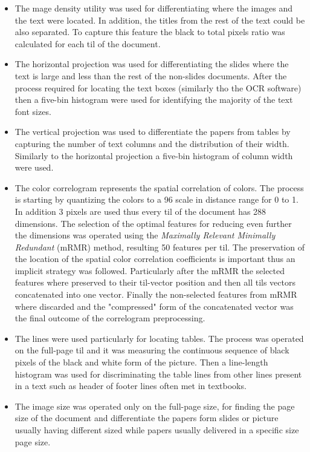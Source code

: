 \begin{itemize}
\item The mage density utility was used for differentiating where the images and the text were located. In addition, the titles from the rest of the text could be also separated. To capture this feature the black to total pixels ratio was calculated for each til of the document. 
\item The horizontal projection was used for differentiating the slides where the text is large and less than the rest of the non-slides documents. After the process required for locating the text boxes (similarly tho the OCR software) then a five-bin histogram were used for identifying the majority of the text font sizes.
\item The vertical projection was used to differentiate the papers from tables by capturing the number of text columns and the distribution of their width. Similarly to the horizontal projection a five-bin histogram of column width were used.
\item The color correlogram represents the spatial correlation of colors. The process is starting by quantizing the colors to a 96 scale in distance range for 0 to 1. In addition 3 pixels are used thus every til of the document has 288 dimensions. The selection of the optimal features for reducing even further the dimensions was operated using the \textit{Maximally Relevant Minimally Redundant} (mRMR) method, resulting 50 features per til. The preservation of the location of the spatial color correlation coefficients is important thus an implicit strategy was followed. Particularly after the mRMR the selected features where preserved to their til-vector position and then all tils vectors concatenated into one vector. Finally the non-selected features from mRMR where discarded and the "compressed" form of the concatenated vector was the final outcome of the correlogram preprocessing.
\item The lines were used particularly for locating tables. The process was operated on the full-page til and it was measuring the continuous sequence of black pixels of the black and white form of the picture. Then a line-length histogram was used for discriminating the table lines from other lines present in a text such as header of footer lines often met in textbooks.
\item The image size was operated only on the full-page size, for finding the page size of the document and differentiate the papers form slides or picture usually having different sized while papers usually delivered in a specific size page size.
\end{itemize}

